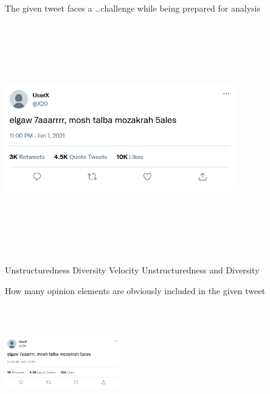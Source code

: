 \documentclass[theme=sleek, randomorder, hidesidemenu]{webquiz}
\begin{document}
\begin{question}
  The given tweet faces a \ldots challenge while being prepared for analysis
  \begin{center}
    \includegraphics[height=100mm, width=100mm]{tweet.png}
  \end{center}
  \begin{choice}[columns=2]
    \incorrect Unstructuredness
    \incorrect Diversity
    \incorrect Velocity
    \correct Unstructuredness and Diversity
  \end{choice}
\end{question}

\begin{question}
    How many opinion elements are obviously included in the given tweet
  \begin{center}
    \includegraphics[height=50mm, width=50mm]{tweet.png}
  \end{center}
  \begin{choice}[columns=2]
  \end{choice}

\end{question}
\end{document}
